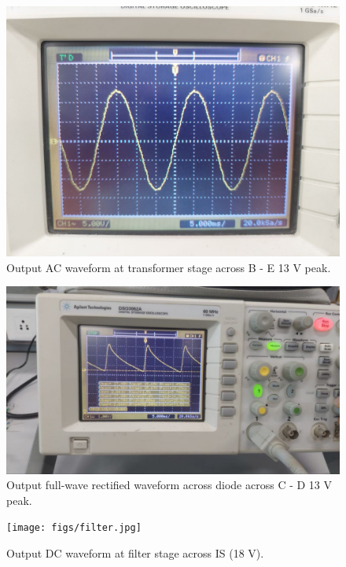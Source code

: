 \documentclass[journal,12pt,twocolumn]{IEEEtran}
\begin{document}
	\begin{figure}[!ht]
		\includegraphics[width=\columnwidth]{figs/transformer.jpg}
		\caption{Output AC waveform at transformer stage across B - E 13 V peak.}
		\label{fig:transformer}
	\end{figure}
	
	\begin{figure}[!ht]
		\includegraphics[width=\columnwidth]{figs/rectified.jpg}
		\caption{Output full-wave rectified waveform across diode across C - D 13 V peak.}
		\label{fig:rectifier}
	\end{figure}
	
	\begin{figure}[!ht]
		\texttt{[image: figs/filter.jpg]}
		\caption{Output DC waveform at filter stage across IS (18 V).}
		\label{fig:filter}
	\end{figure}
	
\end{document}
